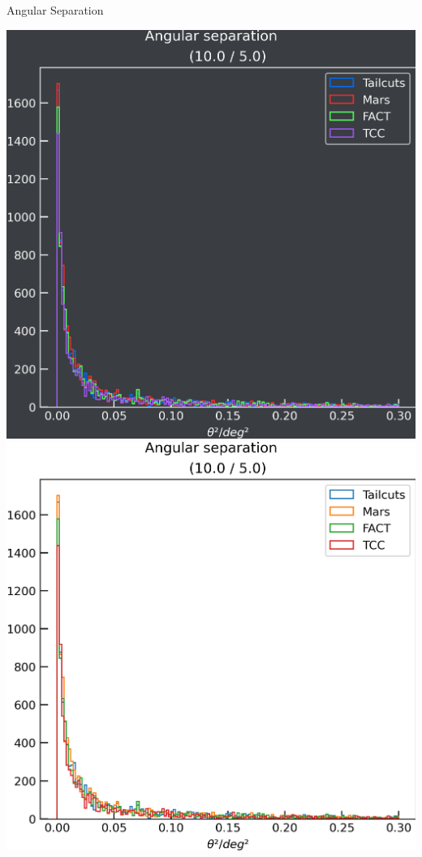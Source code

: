 \begin{frame}{Angular Separation}
\begin{minipage}{0.32\textwidth}
    \fi
  \end{minipage}
  \begin{minipage}{0.32\textwidth}
    \ifdefined\darktheme
      \centering
      \includegraphics[width=\textwidth]{plots/ang_sep/ang_sep__10.0_5.0_dark.png}
    \else
      \centering
      \includegraphics[width=\textwidth]{plots/ang_sep/ang_sep__10.0_5.0_light.png}
    \fi
  \end{minipage}
\end{frame}

